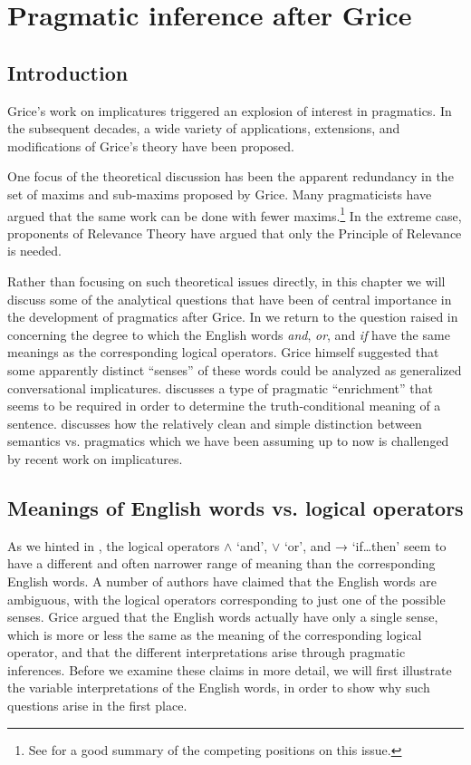 \chapter{Pragmatic inference after Grice}\label{sec:9}

\section{Introduction}\label{sec:9.1}

Grice’s work on implicatures triggered an explosion of interest in pragmatics. In the subsequent decades, a wide variety of applications, extensions, and modifications of Grice’s theory have been proposed.



One focus of the theoretical discussion has been the apparent redundancy in the set of maxims and sub-maxims proposed by Grice. Many pragmaticists have argued that the same work can be done with fewer maxims.\footnote{See \citet[ch. 3]{Birner20122013} for a good summary of the competing positions on this issue.} In the extreme case, proponents of Relevance Theory have argued that only the Principle of Relevance is needed.



Rather than focusing on such theoretical issues directly, in this chapter we will discuss some of the analytical questions that have been of central importance in the development of pragmatics after Grice. In  we return to the question raised in  concerning the degree to which the English words \textit{and}, \textit{or}, and \textit{if} have the same meanings as the corresponding logical operators. Grice himself suggested that some apparently distinct “senses” of these words could be analyzed as generalized conversational implicatures.  discusses a type of pragmatic “enrichment” that seems to be required in order to determine the truth-conditional meaning of a sentence.  discusses how the relatively clean and simple distinction between semantics vs. pragmatics which we have been assuming up to now is challenged by recent work on implicatures.


\section{Meanings of English words vs. logical operators}\label{sec:9.2}

As we hinted in , the logical operators $\wedge$ ‘and’, $\vee$ ‘or’, and → ‘if…then’ seem to have a different and often narrower range of meaning than the corresponding English words. A number of authors have claimed that the English words are ambiguous, with the logical operators corresponding to just one of the possible senses. Grice argued that the English words actually have only a single sense, which is more or less the same as the meaning of the corresponding logical operator, and that the different interpretations arise through pragmatic inferences. Before we examine these claims in more detail, we will first illustrate the variable interpretations of the English words, in order to show why such questions arise in the first place.



